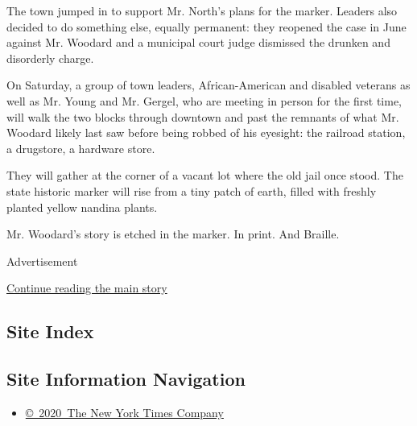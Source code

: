 The town jumped in to support Mr. North's plans for the marker. Leaders
also decided to do something else, equally permanent: they reopened the
case in June against Mr. Woodard and a municipal court judge dismissed
the drunken and disorderly charge.

On Saturday, a group of town leaders, African-American and disabled
veterans as well as Mr. Young and Mr. Gergel, who are meeting in person
for the first time, will walk the two blocks through downtown and past
the remnants of what Mr. Woodard likely last saw before being robbed of
his eyesight: the railroad station, a drugstore, a hardware store.

They will gather at the corner of a vacant lot where the old jail once
stood. The state historic marker will rise from a tiny patch of earth,
filled with freshly planted yellow nandina plants.

Mr. Woodard's story is etched in the marker. In print. And Braille.

Advertisement

\protect\hyperlink{after-bottom}{Continue reading the main story}

\hypertarget{site-index}{%
\subsection{Site Index}\label{site-index}}

\hypertarget{site-information-navigation}{%
\subsection{Site Information
Navigation}\label{site-information-navigation}}

\begin{itemize}
\tightlist
\item
  \href{https://help.nytimes.com/hc/en-us/articles/115014792127-Copyright-notice}{©~2020~The
  New York Times Company}
\end{itemize}

